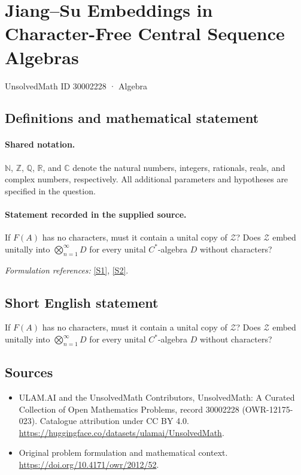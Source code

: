 \documentclass[11pt]{article}
\newcommand{\sref}[2]{\hyperlink{source:#1:#2}{[S#2]}}
\begin{document}
\setcounter{section}{30002227}
\section{Jiang–Su Embeddings in Character-Free Central Sequence Algebras}\label{30002228}
{\small UnsolvedMath ID 30002228 · Algebra}
\subsection{Definitions and mathematical statement}

\paragraph{Shared notation.}$\mathbb N$, $\mathbb Z$, $\mathbb Q$, $\mathbb R$, and $\mathbb C$ denote the natural numbers, integers, rationals, reals, and complex numbers, respectively. All additional parameters and hypotheses are specified in the question.


\paragraph{Statement recorded in the supplied source.}
If $F(A)$ has no characters, must it contain a unital copy of $\mathcal Z$? Does $\mathcal Z$ embed unitally into $\bigotimes_{n=1}^{\infty}D$ for every unital $C^*$-algebra $D$ without characters?
\par\smallskip\textit{Formulation references:} \sref{30002228}{1}, \sref{30002228}{2}.
\subsection{Short English statement}
If $F(A)$ has no characters, must it contain a unital copy of $\mathcal Z$? Does $\mathcal Z$ embed unitally into $\bigotimes_{n=1}^{\infty}D$ for every unital $C^*$-algebra $D$ without characters?
\subsection{Sources}
\begin{itemize}
\item[\hypertarget{source:30002228:1}{S1}] ULAM.AI and the UnsolvedMath Contributors, UnsolvedMath: A Curated Collection of Open Mathematics Problems, record 30002228 (OWR-12175-023). Catalogue attribution under CC BY 4.0.
\url{https://huggingface.co/datasets/ulamai/UnsolvedMath}.
\item[\hypertarget{source:30002228:2}{S2}] Original problem formulation and mathematical context.
\url{https://doi.org/10.4171/owr/2012/52}.
\end{itemize}
\label{end:30002228}
\end{document}
